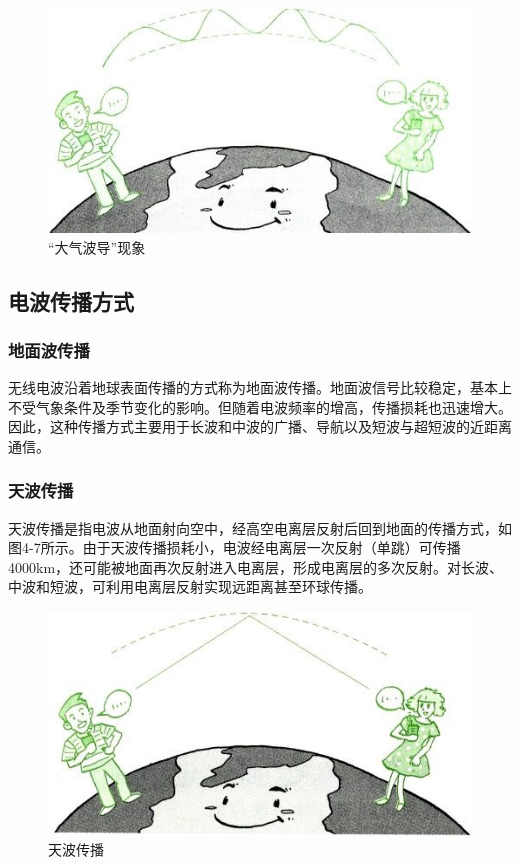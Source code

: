 \documentclass[12pt,UTF8]{ctexbook}
\begin{document}
\begin{figure}[htbp]
	\centering
	\includegraphics[width=0.7\linewidth]{49}
	\caption{“大气波导”现象}
	\label{fig:1}
\end{figure}

\subsection{电波传播方式}

\subsubsection{地面波传播}

无线电波沿着地球表面传播的方式称为地面波传播。地面波信号比较稳定，基本上不受气象条件及季节变化的影响。但随着电波频率的增高，传播损耗也迅速增大。因此，这种传播方式主要用于长波和中波的广播、导航以及短波与超短波的近距离通信。

\subsubsection{天波传播}

天波传播是指电波从地面射向空中，经高空电离层反射后回到地面的传播方式，如图4-7所示。由于天波传播损耗小，电波经电离层一次反射（单跳）可传播4000km，还可能被地面再次反射进入电离层，形成电离层的多次反射。对长波、中波和短波，可利用电离层反射实现远距离甚至环球传播。

\begin{figure}[htbp]
	\centering
	\includegraphics[width=0.7\linewidth]{50}
	\caption{天波传播}
	\label{fig:1}
\end{figure}
\end{document}
